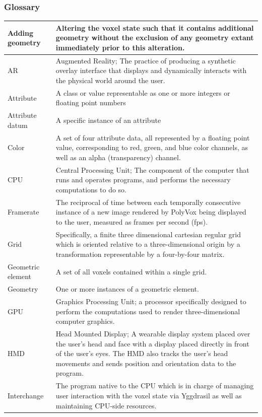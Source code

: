 \documentclass[onecolumn, draftclsnofoot,10pt, compsoc]{IEEEtran}
\begin{document}
\subsubsection{Glossary}
\begin{longtable}{ | l | p{12cm} | }
 \hline			
Adding geometry & Altering the voxel state such that it contains additional geometry without the exclusion of any geometry extant immediately prior to this alteration.  \\ \hline 
AR & Augmented Reality; The practice of producing a synthetic overlay interface that displays and dynamically interacts with the physical world around the user. \\ \hline 
Attribute & A class or value representable as one or more integers or floating point numbers  \\ \hline
Attribute datum & A specific instance of an attribute  \\ \hline
Color & A set of four attribute data, all represented by a floating point value, corresponding to red, green, and blue color channels, as well as an alpha (transparency) channel.  \\ \hline
CPU & Central Processing Unit; The component of the computer that runs and operates programs, and performs the necessary computations to do so.  \\ \hline
Framerate & The reciprocal of time between each temporally consecutive instance of a new image rendered by PolyVox being displayed to the user, measured as frames per second (fps). \\ \hline 
Grid &  Specifically, a finite three dimensional cartesian regular grid which is oriented relative to a three-dimensional origin by a transformation representable by a four-by-four matrix. \\ \hline
Geometric element & A set of all voxels contained within a single grid.  \\ \hline
Geometry & One or more instances of a geometric element.  \\ \hline
GPU & Graphics Processing Unit; a processor specifically designed to perform the computations used to render three-dimensional computer graphics.  \\ \hline
HMD & Head Mounted Display; A wearable display system placed over the user’s head and face with a display placed directly in front of the user’s eyes. The HMD also tracks the user’s head movements and sends position and orientation data to the program.  \\ \hline
Interchange & The program native to the CPU which is in charge of managing user interaction with the voxel state via Yggdrasil as well as maintaining CPU-side resources. \\ \hline

\end{longtable}
\end{document}
